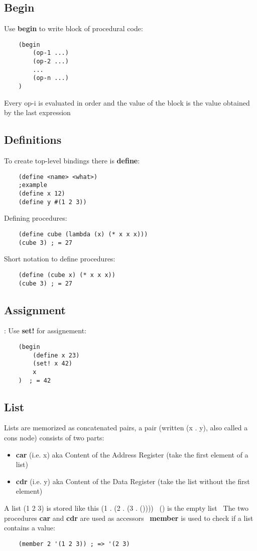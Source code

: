 \subsection{Begin}
Use \textbf{begin} to write block of procedural code:
\begin{lstlisting}
    (begin
        (op-1 ...)
        (op-2 ...)
        ...
        (op-n ...)
    )
\end{lstlisting}

Every op-i is evaluated in order and the value of the block is the value obtained by the last expression

\subsection{Definitions}
To create top-level bindings there is \textbf{define}:
\begin{lstlisting}
    (define <name> <what>)
    ;example
    (define x 12)
    (define y #(1 2 3))
\end{lstlisting}
Defining procedures:
\begin{lstlisting}
    (define cube (lambda (x) (* x x x)))
    (cube 3) ; = 27
\end{lstlisting}
Short notation to define procedures:
\begin{lstlisting}
    (define (cube x) (* x x x))
    (cube 3) ; = 27
\end{lstlisting}

\subsection{Assignment}:
Use \textbf{set!} for assignement:
\begin{lstlisting}
    (begin
        (define x 23)
        (set! x 42)
        x
    )  ; = 42
\end{lstlisting}

\subsection{List}
Lists are memorized as concatenated pairs, a pair (written (x . y), also called a cons node) consists of two parts:
\begin{itemize}
    \item \textbf{car} (i.e. x) aka Content of the Address Register (take the first element of a list)
    \item \textbf{cdr} (i.e. y) aka Content of the Data Register (take the list without the first element)
\end{itemize}
A list (1 2 3) is stored like this (1 . (2 . (3 . ()))) \
() is the empty list \
The two procedures \textbf{car} and \textbf{cdr} are used as accessors \
\textbf{member} is used to check if a list contains a value:
\begin{lstlisting}
    (member 2 '(1 2 3)) ; => '(2 3)
\end{lstlisting}

